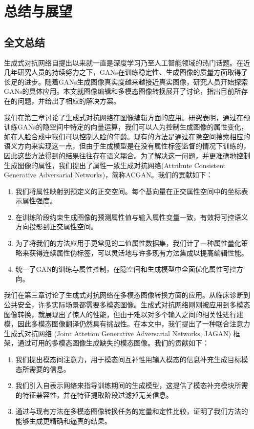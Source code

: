 \chapter{总结与展望}

\section{全文总结}

生成式对抗网络自提出以来就一直是深度学习乃至人工智能领域的热门话题。在近几年研究人员的持续努力之下，GANs在训练稳定性、生成图像的质量方面取得了长足的进步。随着GANs生成图像真实度越来越接近真实图像，研究人员开始探索GANs的具体应用。本文就图像编辑和多模态图像转换展开了讨论，指出目前所存在的问题，并给出了相应的解决方案。

我们在第三章讨论了生成式对抗网络在图像编辑方面的应用。研究表明，通过在预训练GANs的隐空间中特定的向量运算，我们可以人为控制生成图像的属性变化，如在人脸合成中我们可以控制人脸的年龄。现有的方法是通过在隐空间搜索相应的语义方向来实现这一点，但由于生成模型是在没有属性标签监督的情况下训练的，因此这些方法得到的结果往往存在语义耦合。为了解决这一问题，并更准确地控制生成图像的属性，我们提出了属性一致生成对抗网络(Attribute Consistent Generative Adversarial Networks)，简称ACGAN。我们的贡献如下：
\begin{enumerate}
    \item 我们将属性映射到预定义的正交空间。每个基向量在正交属性空间中的坐标表示属性强度。
    \item 在训练阶段约束生成图像的预测属性值与输入属性变量一致，有效将可控语义方向投影到正交属性空间。
    \item 为了将我们的方法应用于更常见的二值属性数据集，我们计了一种属性量化策略来获得连续属性伪标签，可以灵活地与许多现有方法集成以提高编辑性能。
    \item 统一了GAN的训练与属性控制，在隐空间和生成模型中全面优化属性可控方向。
\end{enumerate}

我们在第三章讨论了生成式对抗网络在多模态图像转换方面的应用。从临床诊断到公共安全，许多实际场景都需要多模态图像。生成式对抗网络刚刚被应用到多模态图像转换，就展现出了惊人的性能，但由于难以对多个输入之间的相关性进行建模，因此多模态图像翻译仍然具有挑战性。在本文中，我们提出了一种联合注意力生成式对抗网络 (Joint Attetion Generative Adversarial Networks, JAGAN) 框架，通过可用的多模态图像生成缺失的模态图像。我们的贡献如下：
\begin{enumerate}
    \item 我们提出模态间注意力，用于模态间互补性用输入模态的信息补充生成目标模态所需要的信息。
    \item 我们引入自表示网络来指导训练期间的生成模型，这提供了模态补充模块所需的特征兼容性，并在特征提取阶段过滤掉无关信息。
    \item 通过与现有方法在多模态图像转换任务的定量和定性比较，证明了我们方法的能够生成更精确和逼真的结果。
\end{enumerate}

